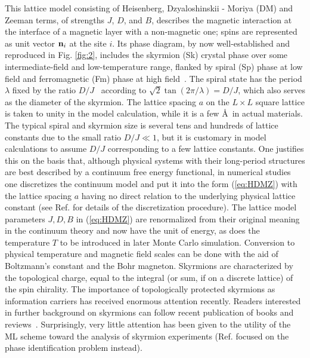 \documentclass[reprint,amsmath,amssymb,aps,showpacs,superscriptaddress,prb]{revtex4-1}
\renewcommand{\v}[1]{{\bf #1}}
\begin{document}
This lattice model  consisting of Heisenberg, Dzyaloshinskii - Moriya (DM) and Zeeman terms, of strengths $J$, $D$, and $B$, describes the magnetic interaction at the interface of a magnetic layer with a non-magnetic one; spins are represented as unit vector $\v n_i$ at the site $i$. Its phase diagram, by now well-established and reproduced in Fig. \ref{fig:2}, includes the skyrmion (Sk) crystal phase over some intermediate-field and low-temperature range, flanked by spiral (Sp) phase at low field and ferromagnetic (Fm) phase at high field~\cite{nagaosa-review,skyrmion-book,jiang-review,fert-review,han-book}. The spiral state has the period $\lambda$ fixed by the ratio $D/J$~\cite{han09,han-book} according to $\sqrt{2}\tan (2\pi/\lambda)  = D/J$, which also serves as the diameter of the skyrmion. The lattice spacing $a$ on the $L\times L$ square lattice is taken to unity in the model calculation, while it is a few \AA~in actual materials.  The typical spiral and skyrmion size is several tens and hundreds of lattice constants due to the small ratio $D/J \ll 1$, but it is customary in model calculations to assume $D/J$ corresponding to a few lattice constants. One justifies this on the basis that, although physical systems with their long-period structures are best described by a continuum free energy functional, in numerical studies one discretizes the continuum model and put it into the form (\ref{eq:HDMZ}) with the lattice spacing $a$ having no direct relation to the underlying physical lattice constant (see Ref.  for details of the discretization procedure). The lattice model parameters $J, D, B$ in (\ref{eq:HDMZ}) are renormalized from their original meaning in the continuum theory and now have the unit of energy, as does the temperature $T$ to be introduced in later Monte Carlo simulation. Conversion to physical temperature and magnetic field scales can be done with the aid of Boltzmann's constant and the Bohr magneton. Skyrmions are characterized by the topological charge, equal to the integral (or sum, if on a discrete lattice) of the spin chirality. The importance of topologically protected skyrmions as information carriers has received enormous attention recently. Readers interested in further background on skyrmions can follow recent publication of books and reviews~\cite{nagaosa-review,skyrmion-book,jiang-review,fert-review,han-book}. Surprisingly, very little attention has been given to the utility of the ML scheme toward the analysis of skyrmion experiments (Ref. \cite{russian18} focused on the phase identification problem instead).
\end{document}
